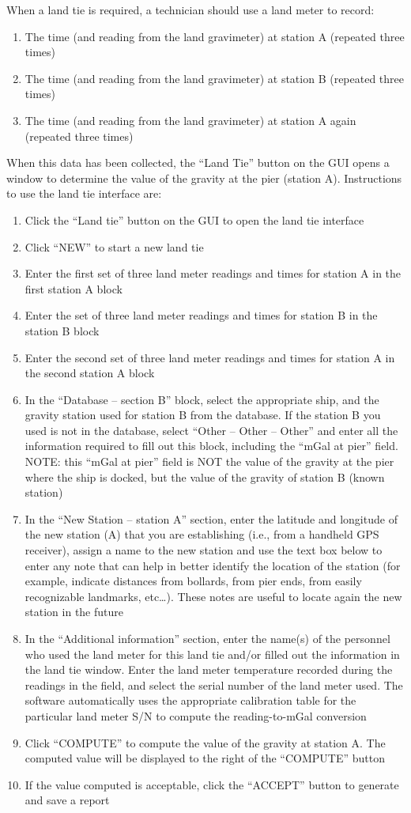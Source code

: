 \documentclass{pfpe-manual}
\begin{document}
When a land tie is required, a technician should use a land meter to record:
\begin{enumerate}
\item The time (and reading from the land gravimeter) at station A (repeated three times)
\item The time (and reading from the land gravimeter) at station B (repeated three times)
\item The time (and reading from the land gravimeter) at station A again (repeated three times)
\end{enumerate}
When this data has been collected, the “Land Tie” button on the GUI opens a window to determine the value of the gravity at the pier (station A). Instructions to use the land tie interface are:
\begin{enumerate}
\item Click the “Land tie” button on the GUI to open the land tie interface
\item Click “NEW” to start a new land tie
\item Enter the first set of three land meter readings and times for station A in the first station A block
\item Enter the set of three land meter readings and times for station B in the station B block
\item Enter the second set of three land meter readings and times for station A in the second station A block
\item In the “Database – section B” block, select the appropriate ship, and the gravity station used for station B from the database. If the station B you used is not in the database, select “Other – Other – Other” and enter all the information required to fill out this block, including the “mGal at pier” field. NOTE: this “mGal at pier” field is NOT the value of the gravity at the pier where the ship is docked, but the value of the gravity of station B (known station)
\item In the “New Station – station A” section, enter the latitude and longitude of the new station (A) that you are establishing (i.e., from a handheld GPS receiver), assign a name to the new station and use the text box below to enter any note that can help in better identify the location of the station (for example, indicate distances from bollards, from pier ends, from easily recognizable landmarks, etc…). These notes are useful to locate again the new station in the future
\item In the “Additional information” section, enter the name(s) of the personnel who used the land meter for this land tie and/or filled out the information in the land tie window. Enter the land meter temperature recorded during the readings in the field, and select the serial number of the land meter used. The software automatically uses the appropriate calibration table for the particular land meter S/N to compute the reading-to-mGal conversion
\item Click “COMPUTE” to compute the value of the gravity at station A. The computed value will be displayed to the right of the “COMPUTE” button
\item If the value computed is acceptable, click the “ACCEPT” button to generate and save a report
\end{enumerate}
\end{document}
